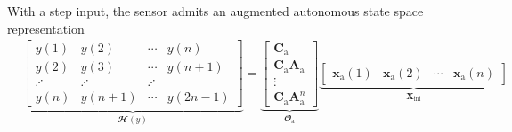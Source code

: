 \documentclass[presentation]{beamer}
\begin{document}
\begin{frame}[label={slide:preliminaries3}]{With a step input, the sensor admits an \linebreak augmented autonomous state space representation}
  \small
\begin{equation*} \begin{aligned} & \underbrace{ \begin{bmatrix} y(1) & y(2) & \cdots & y(n) \\ y(2) & y(3) & \cdots & y(n+1) \\ \iddots & \iddots & \iddots \\ y(n) & y(n+1) & \cdots & y(2n-1) \end{bmatrix} }_{ \mathbfcal{H}({y}) } = \underbrace{ \begin{bmatrix} {\mathbf{C}}_\text{a} \\ {\mathbf{C}}_\text{a} {\mathbf{A}}_\text{a} \\ \vdots \\ {\mathbf{C}}_\text{a} {\mathbf{A}}_\text{a}^{n} \end{bmatrix} }_{ {\mathbfcal{O}}_\text{a} }  \underbrace{ \begin{bmatrix} \mathbf{x}_\text{a}(1) & \mathbf{x}_\text{a}(2) & \cdots & \mathbf{x}_\text{a}(n) \end{bmatrix} }_{ \mathbf{X}_\text{ini} } \end{aligned} \end{equation*}
\normalsize
\end{frame}
\end{document}
